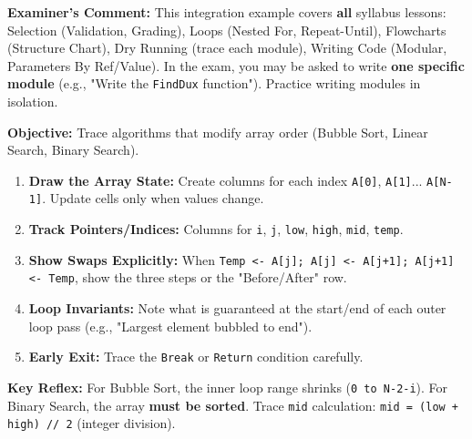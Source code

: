 \documentclass[11pt]{article}
\begin{document}
\begin{exoresolu}
\noindent\textbf{Examiner's Comment:} This integration example covers \textbf{all} syllabus lessons: Selection (Validation, Grading), Loops (Nested For, Repeat-Until), Flowcharts (Structure Chart), Dry Running (trace each module), Writing Code (Modular, Parameters By Ref/Value). In the exam, you may be asked to write \textbf{one specific module} (e.g., "Write the \texttt{FindDux} function"). Practice writing modules in isolation.
\end{exoresolu}

\begin{methode}
\textbf{Objective:} Trace algorithms that modify array order (Bubble Sort, Linear Search, Binary Search).
\begin{enumerate}
    \item \textbf{Draw the Array State:} Create columns for each index \texttt{A[0]}, \texttt{A[1]}... \texttt{A[N-1]}. Update cells only when values change.
    \item \textbf{Track Pointers/Indices:} Columns for \texttt{i}, \texttt{j}, \texttt{low}, \texttt{high}, \texttt{mid}, \texttt{temp}.
    \item \textbf{Show Swaps Explicitly:} When \texttt{Temp <- A[j]; A[j] <- A[j+1]; A[j+1] <- Temp}, show the three steps or the "Before/After" row.
    \item \textbf{Loop Invariants:} Note what is guaranteed at the start/end of each outer loop pass (e.g., "Largest element bubbled to end").
    \item \textbf{Early Exit:} Trace the \texttt{Break} or \texttt{Return} condition carefully.
\end{enumerate}
\textbf{Key Reflex:} For Bubble Sort, the inner loop range shrinks (\texttt{0 to N-2-i}). For Binary Search, the array \textbf{must be sorted}. Trace \texttt{mid} calculation: \texttt{mid = (low + high) // 2} (integer division).
\end{methode}
\end{document}
